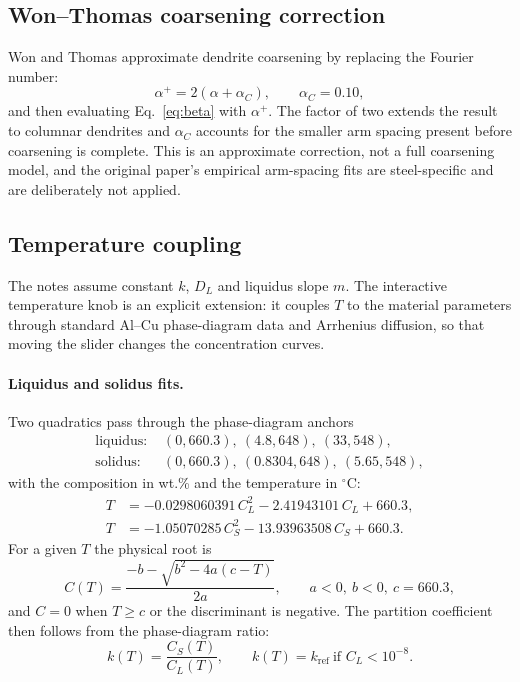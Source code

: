 \documentclass[11pt,a4paper]{article}
\begin{document}
\subsection{Won--Thomas coarsening correction}

Won and Thomas approximate dendrite coarsening by replacing the Fourier number:
\begin{equation}
  \boxed{\alpha^{+}=2\left(\alpha+\alpha_C\right)},
  \qquad \alpha_C=0.10,
\end{equation}
and then evaluating Eq.~\eqref{eq:beta} with $\alpha^{+}$. The factor of two
extends the result to columnar dendrites and $\alpha_C$ accounts for the
smaller arm spacing present before coarsening is complete. This is an
approximate correction, not a full coarsening model, and the original paper's
empirical arm-spacing fits are steel-specific and are deliberately not applied.

\subsection{Temperature coupling}
\label{sec:temperature}

The notes assume constant $k$, $D_L$ and liquidus slope $m$. The interactive
temperature knob is an explicit extension: it couples $T$ to the material
parameters through standard Al--Cu phase-diagram data and Arrhenius diffusion,
so that moving the slider changes the concentration curves.

\paragraph{Liquidus and solidus fits.} Two quadratics pass through the
phase-diagram anchors
\begin{align}
  \text{liquidus: } &(0,660.3),\ (4.8,648),\ (33,548),\\
  \text{solidus: }  &(0,660.3),\ (0.8304,648),\ (5.65,548),
\end{align}
with the composition in wt.\% and the temperature in $^\circ$C:
\begin{align}
  T &= -0.0298060391\,C_L^2-2.41943101\,C_L+660.3, \label{eq:liqfit}\\
  T &= -1.05070285\,C_S^2-13.93963508\,C_S+660.3. \label{eq:sol}
\end{align}
For a given $T$ the physical root is
\begin{equation}
  C(T)=\frac{-b-\sqrt{b^2-4a(c-T)}}{2a},
  \qquad a<0,\ b<0,\ c=660.3,
\end{equation}
and $C=0$ when $T\ge c$ or the discriminant is negative. The partition
coefficient then follows from the phase-diagram ratio:
\begin{equation}
  \boxed{k(T)=\frac{C_S(T)}{C_L(T)}}, \qquad k(T)=k_{\text{ref}}\ \text{if } C_L<10^{-8}.
\end{equation}
\end{document}
